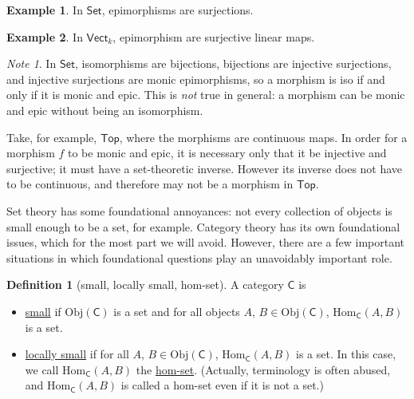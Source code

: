 \documentclass[a4paper]{report}
\newcommand{\defn}[1]{\ul{#1}}
\newcommand{\Obj}{\mathrm{Obj}}
\newcommand{\Hom}{\mathrm{Hom}}
\theoremstyle{definition}
\newtheorem{definition}{Definition}[section]
\newtheorem{example}{Example}[section]
\theoremstyle{plain}
\theoremstyle{remark}
\newtheorem{note}{Note}[section]
\begin{document}
\begin{example}
  \label{eg:epimorphismsinkvect}
  In $\mathsf{Set}$, epimorphisms are surjections.
\end{example}

\begin{example}
  In $\mathsf{Vect}_{k}$, epimorphism are surjective linear maps.
\end{example}

\begin{note}
  In $\mathsf{Set}$, isomorphisms are bijections, bijections are injective surjections, and injective surjections are monic epimorphisms, so a morphism is iso if and only if it is monic and epic. This is \emph{not} true in general: a morphism can be monic and epic without being an isomorphism.

  Take, for example, $\mathsf{Top}$, where the morphisms are continuous maps. In order for a morphism $f$ to be monic and epic, it is necessary only that it be injective and surjective; it must have a set-theoretic inverse. However its inverse does not have to be continuous, and therefore may not be a morphism in $\mathsf{Top}$.
\end{note}

Set theory has some foundational annoyances: not every collection of objects is small enough to be a set, for example. Category theory has its own foundational issues, which for the most part we will avoid. However, there are a few important situations in which foundational questions play an unavoidably important role.
\begin{definition}[small, locally small, hom-set]
  \label{def:smalllocallysmallcategoryhomset}
  A category $\mathsf{C}$ is 
  \begin{itemize}
    \item \defn{small} if $\Obj(\mathsf{C})$ is a set and for all objects $A$, $B \in \Obj(\mathsf{C})$, $\Hom_{\mathsf{C}}(A, B)$ is a set.

    \item \defn{locally small} if for all $A$, $B \in \Obj(\mathsf{C})$, $\Hom_{\mathsf{C}}(A, B)$ is a set. In this case, we call $\Hom_{\mathsf{C}}(A, B)$ the \defn{hom-set}. (Actually, terminology is often abused, and $\Hom_{\mathsf{C}}(A, B)$ is called a hom-set even if it is not a set.)
  \end{itemize}
\end{definition}
\end{document}
